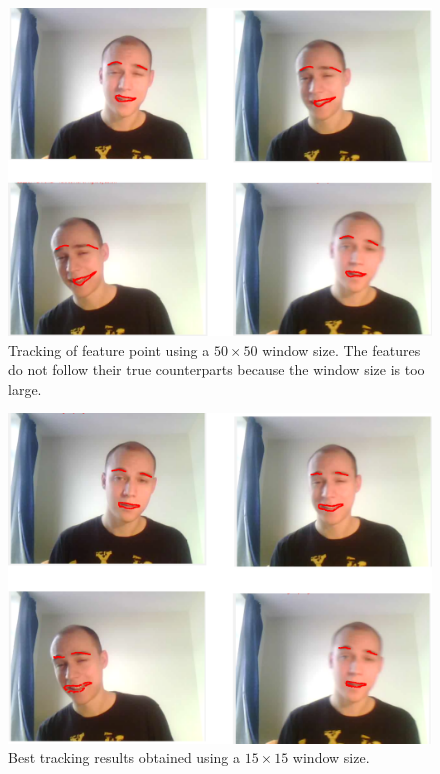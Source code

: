 \documentclass[11pt,a4paper]{report}
\begin{document}
\begin{figure}[H]
\begin{centering}
\includegraphics[scale=0.27]{images/50x50opt.png}
\par\end{centering}

\caption{Tracking of feature point using a $50 \times 50$ window size. The
  features do not follow their true counterparts because the window size is too large.}
\label{fg:50opt}
\end{figure}

\begin{figure}[H]
\begin{centering}
\includegraphics[scale=0.27]{images/8x8opt.png}
\par\end{centering}

\caption{Best tracking results obtained using a $15 \times 15$ window size.}
\label{fg:8opt}
\end{figure}
\end{document}
